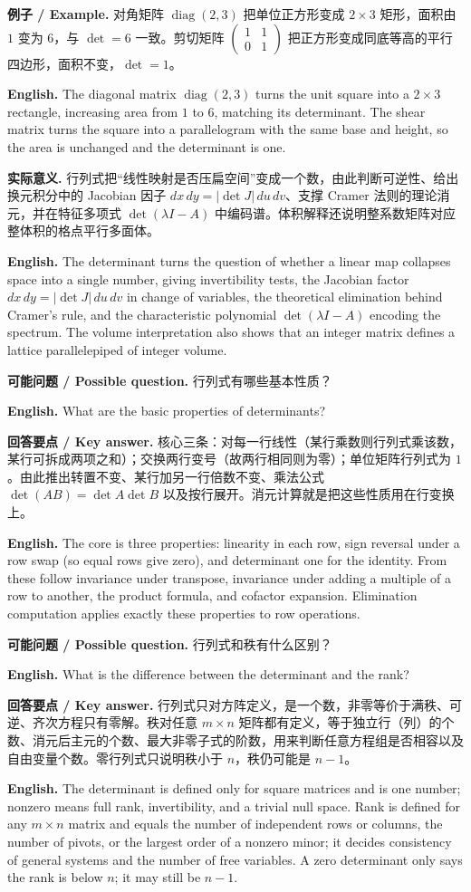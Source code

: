 \documentclass[UTF8,11pt,a4paper]{ctexart}
\newcommand{\EN}[1]{\par\noindent\textbf{English.} #1\par}
\newcommand{\EX}[2]{\par\noindent\textbf{例子 / Example.} #1\par\EN{#2}}
\newcommand{\ASK}[4]{\par\noindent\textbf{可能问题 / Possible question.} #1\par\EN{#2}\noindent\textbf{回答要点 / Key answer.} #3\par\EN{#4}\medskip}
\begin{document}
\EX{对角矩阵 $\operatorname{diag}(2,3)$ 把单位正方形变成 $2\times3$ 矩形，面积由 $1$ 变为 $6$，与 $\det=6$ 一致。剪切矩阵 $\begin{pmatrix}1&1\\0&1\end{pmatrix}$ 把正方形变成同底等高的平行四边形，面积不变，$\det=1$。}{The diagonal matrix $\operatorname{diag}(2,3)$ turns the unit square into a $2\times3$ rectangle, increasing area from $1$ to $6$, matching its determinant. The shear matrix turns the square into a parallelogram with the same base and height, so the area is unchanged and the determinant is one.}
\noindent\textbf{实际意义.} 行列式把“线性映射是否压扁空间”变成一个数，由此判断可逆性、给出换元积分中的 Jacobian 因子 $dx\,dy=|\det J|\,du\,dv$、支撑 Cramer 法则的理论消元，并在特征多项式 $\det(\lambda I-A)$ 中编码谱。体积解释还说明整系数矩阵对应整体积的格点平行多面体。
\EN{The determinant turns the question of whether a linear map collapses space into a single number, giving invertibility tests, the Jacobian factor $dx\,dy=|\det J|\,du\,dv$ in change of variables, the theoretical elimination behind Cramer's rule, and the characteristic polynomial $\det(\lambda I-A)$ encoding the spectrum. The volume interpretation also shows that an integer matrix defines a lattice parallelepiped of integer volume.}
\ASK{行列式有哪些基本性质？}{What are the basic properties of determinants?}{核心三条：对每一行线性（某行乘数则行列式乘该数，某行可拆成两项之和）；交换两行变号（故两行相同则为零）；单位矩阵行列式为 $1$。由此推出转置不变、某行加另一行倍数不变、乘法公式 $\det(AB)=\det A\det B$ 以及按行展开。消元计算就是把这些性质用在行变换上。}{The core is three properties: linearity in each row, sign reversal under a row swap (so equal rows give zero), and determinant one for the identity. From these follow invariance under transpose, invariance under adding a multiple of a row to another, the product formula, and cofactor expansion. Elimination computation applies exactly these properties to row operations.}
\ASK{行列式和秩有什么区别？}{What is the difference between the determinant and the rank?}{行列式只对方阵定义，是一个数，非零等价于满秩、可逆、齐次方程只有零解。秩对任意 $m\times n$ 矩阵都有定义，等于独立行（列）的个数、消元后主元的个数、最大非零子式的阶数，用来判断任意方程组是否相容以及自由变量个数。零行列式只说明秩小于 $n$，秩仍可能是 $n-1$。}{The determinant is defined only for square matrices and is one number; nonzero means full rank, invertibility, and a trivial null space. Rank is defined for any $m\times n$ matrix and equals the number of independent rows or columns, the number of pivots, or the largest order of a nonzero minor; it decides consistency of general systems and the number of free variables. A zero determinant only says the rank is below $n$; it may still be $n-1$.}
\end{document}
